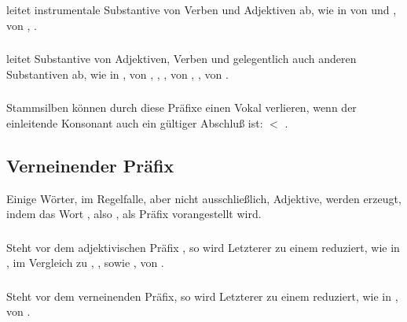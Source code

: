 \subsubsection{}  leitet instrumentale Substantive von Verben und Adjektiven ab,
wie in   von  und
,  von , .

\subsubsection{}  leitet Substantive von Adjektiven, Verben und gelegentlich auch
anderen Substantiven ab, wie in ,  von
, , ,  von
, ,   von 
.

\subsubsection{} Stammsilben k\"onnen durch diese Pr\"afixe einen Vokal verlieren, wenn
der einleitende Konsonant auch ein g\"ultiger Abschlu\ss{} ist: 
 $<$  .


\subsection{Verneinender Pr\"afix} Einige W\"orter, im Regelfalle, aber nicht ausschlie\ss{}lich,
Adjektive, werden erzeugt, indem das Wort , also , als Pr\"afix vorangestellt wird.

\subsubsection{} Steht  vor dem adjektivischen Pr\"afix , so wird Letzterer
zu einem  reduziert, wie in ,  im Vergleich zu
, , sowie ,  von
 .

\subsubsection{} Steht  vor dem verneinenden Pr\"afix, so wird Letzterer zu einem
 reduziert, wie in ,  von  .


